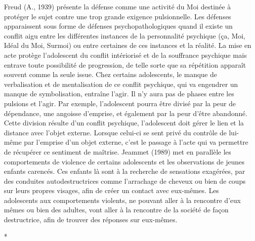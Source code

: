 \documentclass[12pt, a4paper]{book}
\begin{document}
\begin{spacing}{1.5}
Freud (A., 1939) présente la défense comme une activité du Moi destinée à protéger le sujet contre une trop grande exigence pulsionnelle. Les défenses apparaissent sous forme de défenses psychopathologiques quand il existe un conflit aigu entre les différentes instances de la personnalité psychique (ça, Moi, Idéal du Moi, Surmoi) ou entre certaines de ces instances et la réalité. La mise en acte protège l'adolescent du conflit intériorisé et de la souffrance psychique mais entrave toute possibilité de progression, de telle sorte que sa répétition apparaît souvent comme la seule issue. Chez certains adolescents, le manque de verbalisation et de mentalisation de ce conflit psychique, qui va engendrer un manque de symbolisation, entraîne l'agir. Il n'y aura pas de phases entre les pulsions et l'agir. Par exemple, l'adolescent pourra  être divisé par la peur de dépendance, une angoisse d'emprise, et également par la peur d'être abandonné. Cette division résulte d'un conflit psychique, l'adolescent doit gérer le lien et la distance avec l'objet externe. Lorsque celui-ci se sent privé du contrôle de lui-même par l'emprise d'un objet externe, c'est le passage à l'acte qui va permettre de récupérer ce sentiment de maîtrise. Jeammet (1989) met en parallèle les comportements de violence de certains adolescents et les observations de jeunes enfants carencés. Ces enfants là sont à la recherche de sensations exagérées, par des conduites autodestructrices comme l'arrachage de cheveux ou bien de coups sur leurs propres visages, afin de créer un contact avec eux-mêmes. Les adolescents aux comportements violents, ne pouvant aller à la rencontre d'eux mêmes ou bien des adultes, vont aller à la rencontre de la société de façon destructrice, afin de trouver des réponses sur eux-mêmes. 

\vspace{1cm}
\centerline{*}
\vspace{1cm}


\end{spacing}
\end{document}
